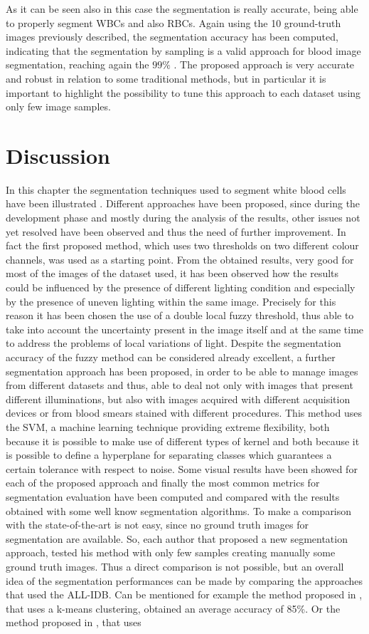 \documentclass[final,a4paper,12pt,english]{UnicaPhdThesis3}
\begin{document}
	As it can be seen also in this case the segmentation is really accurate, being able to properly segment WBCs and also RBCs. Again using the 10 ground-truth images previously described, the segmentation accuracy has been computed, indicating that the segmentation by sampling is a valid approach for blood image segmentation, reaching again the $99\%$ . The proposed approach is very accurate and robust in relation to some traditional methods, but in particular it is important to highlight the possibility to tune this approach to each dataset using only few image samples. 
	
	\section{Discussion}\label{sec:Discussion}
	In this chapter the segmentation techniques used to segment white blood cells have been illustrated . Different approaches have been proposed, since during the development phase and mostly during the analysis of the results, other issues not yet resolved have been observed and thus the need of further improvement. In fact the first proposed method, which uses two thresholds on two different colour channels, was used as a starting point. From the obtained results, very good for most of the images of the dataset used, it has been observed how the results could be influenced by the presence of different lighting condition and especially by the presence of uneven lighting within the same image. Precisely for this reason it has been chosen the use of a double local fuzzy threshold, thus able to take into account the uncertainty present in the image itself and at the same time to address the problems of local variations of light. Despite the segmentation accuracy of the fuzzy method can be considered already excellent, a further segmentation approach has been proposed, in order to be able to manage images from different datasets and thus, able to deal not only with images that present different illuminations, but also with images acquired with different acquisition devices or from blood smears stained with different procedures. This method uses the SVM, a machine learning technique providing extreme flexibility, both because it is possible to make use of different types of kernel and both because it is possible to define a hyperplane for separating classes which guarantees a certain tolerance with respect to noise. Some visual results have been showed for each of the proposed approach and finally the most common metrics for segmentation evaluation have been computed and compared with the results obtained with some well know segmentation algorithms. To make a comparison with the state-of-the-art is not easy, since no ground truth images for segmentation are available. So, each author that proposed a new segmentation approach, tested his method with only few samples creating manually some ground truth images. Thus a direct comparison is not possible, but an overall idea of the segmentation performances can be made by comparing the approaches that used the ALL-IDB. Can be mentioned for example the method proposed in \cite{Rawat}, that uses a k-means clustering, obtained an average accuracy of 85\%. Or the method proposed in \cite{Alilou}, that uses 
\end{document}
